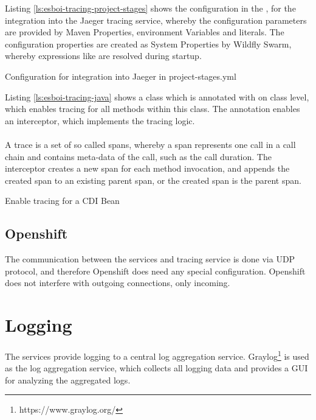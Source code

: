 Listing \vref{ls:esboi-tracing-project-stages} shows the configuration  in the , for the integration into the Jaeger tracing service, whereby the configuration parameters are provided by Maven Properties, environment Variables and literals. The configuration properties are created as System Properties by Wildfly Swarm, whereby  expressions like  are resolved during startup.

\begin{listing}[h]
	\caption{Configuration for integration into Jaeger in project-stages.yml}
	\label{ls:esboi-tracing-project-stages}
\end{listing}

Listing \vref{ls:esboi-tracing-java} shows a class which is annotated with  on class level, which enables tracing for all methods within this class. The annotation  enables an interceptor, which implements the tracing logic. 
\\ \\
A trace is a set of so called spans, whereby a span represents one call in a call chain and contains meta-data of the call, such as the call duration. The interceptor creates a new span for each method invocation, and appends the created span to an existing parent span, or the created span is the parent span. 

\begin{listing}[h]
	\caption{Enable tracing for a CDI Bean}
	\label{ls:esboi-tracing-java}
\end{listing}

\subsection{Openshift}
\label{sec:esbi-tracing-openshift}
The communication between the services and tracing service is done via UDP protocol, and therefore Openshift does need any special configuration. Openshift does not interfere with outgoing connections, only incoming.

\section{Logging}
\label{sec:esbi-logging}
The services provide logging to a central log aggregation service. Graylog\footnote{https://www.graylog.org/} is used as the log aggregation service, which collects all logging data and provides a GUI for analyzing the aggregated logs.

